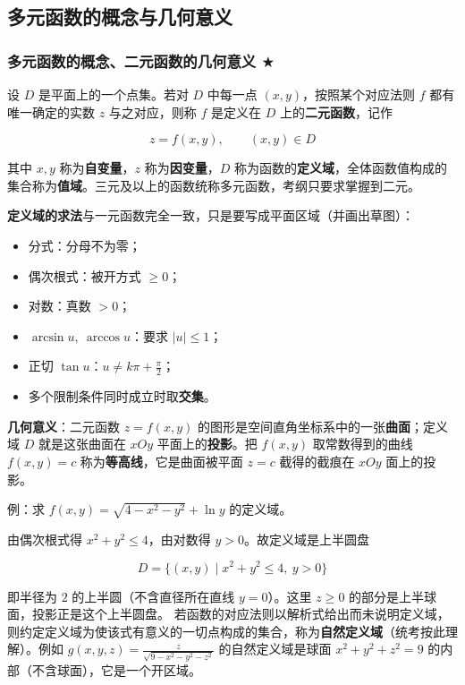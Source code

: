 \documentclass[11pt,openany,UTF8]{ctexbook}
\begin{document}
\subsection{多元函数的概念与几何意义}

\subsubsection{多元函数的概念、二元函数的几何意义 $\bigstar$}

设 $D$ 是平面上的一个点集。若对 $D$ 中每一点 $(x,y)$，按照某个对应法则 $f$ 都有唯一确定的实数 $z$ 与之对应，则称 $f$ 是定义在 $D$ 上的\textbf{二元函数}，记作

\[z=f(x,y),\qquad (x,y)\in D\]

其中 $x,y$ 称为\textbf{自变量}，$z$ 称为\textbf{因变量}，$D$ 称为函数的\textbf{定义域}，全体函数值构成的集合称为\textbf{值域}。三元及以上的函数统称多元函数，考纲只要求掌握到二元。

\textbf{定义域的求法}与一元函数完全一致，只是要写成平面区域（并画出草图）：

\begin{itemize}
\item 分式：分母不为零；
\item 偶次根式：被开方式 $\ge 0$；
\item 对数：真数 $>0$；
\item $\arcsin u,\ \arccos u$：要求 $\vert u\vert \le 1$；
\item 正切 $\tan u$：$u\ne k\pi+\frac{\pi}{2}$；
\item 多个限制条件同时成立时取\textbf{交集}。
\end{itemize}
\textbf{几何意义}：二元函数 $z=f(x,y)$ 的图形是空间直角坐标系中的一张\textbf{曲面}；定义域 $D$ 就是这张曲面在 $xOy$ 平面上的\textbf{投影}。把 $f(x,y)$ 取常数得到的曲线 $f(x,y)=c$ 称为\textbf{等高线}，它是曲面被平面 $z=c$ 截得的截痕在 $xOy$ 面上的投影。

例：求 $f(x,y)=\sqrt{4-x^{2}-y^{2}}+\ln y$ 的定义域。

由偶次根式得 $x^{2}+y^{2}\le 4$，由对数得 $y>0$。故定义域是上半圆盘

\[D=\{(x,y)\mid x^{2}+y^{2}\le 4,\ y>0\}\]

即半径为 $2$ 的上半圆（不含直径所在直线 $y=0$）。这里 $z\ge 0$ 的部分是上半球面，投影正是这个上半圆盘。 若函数的对应法则以解析式给出而未说明定义域，则约定定义域为使该式有意义的一切点构成的集合，称为\textbf{自然定义域}（统考按此理解）。例如 $g(x,y,z)=\frac{z}{\sqrt{9-x^{2}-y^{2}-z^{2}}}$ 的自然定义域是球面 $x^{2}+y^{2}+z^{2}=9$ 的内部（不含球面），它是一个开区域。
\end{document}

